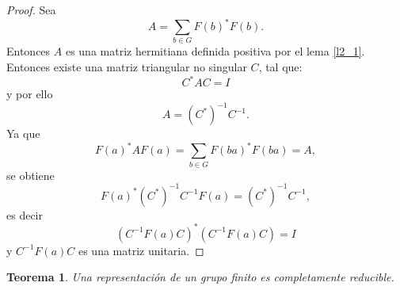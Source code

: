 \documentclass[12pt]{book}
\newtheorem{theorem}{Teorema}[section]
\theoremstyle{definition}
\newcounter{in}
\newcounter{ini}
\begin{document}
\begin{proof}
  Sea
  \begin{equation*}
    A=\sum_{b \in G} F \left(b\right)^{*}F\left(b\right).
  \end{equation*}
  Entonces $A$ es una matriz hermitiana definida positiva por el lema
\ref{l2_1}. Entonces existe una matriz triangular no singular $C$, tal
que:
  \begin{equation*}
    C^{*}AC= I
  \end{equation*}
  y por ello
  \begin{equation}
    \label{eq:9}
    A=(C^{*})^{-1}C^{-1}.
  \end{equation}
  Ya que
  \begin{equation}
    \label{eq:10}
    F\left(a\right)^{*} AF\left(a\right)=\sum_{b \in G} F\left(ba\right)^{*} F\left(ba\right)=A,
  \end{equation}
  se obtiene
  \begin{equation}
    \label{eq:11}
    F\left(a\right)^{*}(C^{*})^{-1}C^{-1}F\left(a\right)=(C^{*})^{-1}C^{-1},
  \end{equation}
  es decir
  \begin{equation}
    \label{eq:12}
    (C^{-1}F(a)C)^{*}(C^{-1}F(a)C)=I
  \end{equation}
  y $C^{-1}F(a)C$ es una matriz unitaria.
\end{proof}
\begin{theorem}
  \label{t2_4}
  Una representación de un grupo finito es
  completamente reducible.
\end{theorem}
\end{document}
